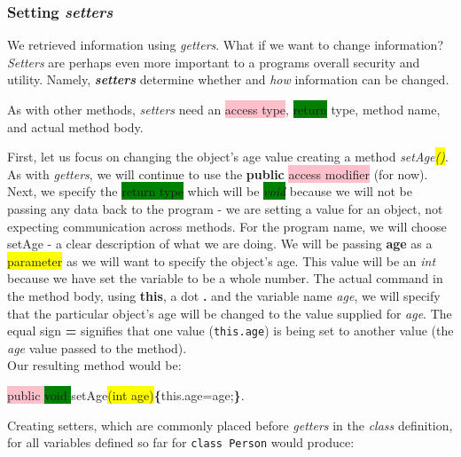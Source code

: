 \documentclass{article}
\begin{document}
\begin{flushleft}
\subsubsection{Setting \emph{setters}}
We retrieved information using \emph{getters}. What if we want to change information? \emph{Setters} are perhaps even more important to a programs overall security and utility. Namely, \textbf{\emph{setters}} determine whether and \emph{how} information can be changed.\par
As with other methods, \emph{setters} need an  \colorbox{pink}{access type}, \colorbox{green}{return} type, method \colorbox{babyblueeyes}{name}, and actual \colorbox{bananamania}{method body}. \par
First, let us focus on changing the object's age value creating a method \emph{ \colorbox{babyblueeyes}{setAge}\colorbox{yellow}{()}}. As with \emph{getters}, we will continue to use the \textbf{public} \colorbox{pink}{access modifier} (for now). Next, we specify the \colorbox{green}{return type} which will be \emph{\colorbox{green}{void}} because we will not be passing any data back to the program - we are setting a value for an object, not expecting communication across methods. For the program name, we will choose \colorbox{babyblueeyes}{setAge} - a clear description of what we are doing. We will be passing \textbf{age} as a \colorbox{yellow}{parameter} as we will want to specify the object's age. This value will be an \emph{int} because we have set the variable to be a whole number. The actual command in the \colorbox{bananamania}{method body}, using \textbf{this}, a dot \textbf{.} and the variable name \emph{age}, we will specify that the particular object's age will be changed to the value supplied for \emph{age}. The equal sign \textbf{=} signifies that one value (\texttt{this.age}) is being set to another value (the \emph{age} value passed to the method). \\ Our resulting method would be:
\begin{tcolorbox}[enhanced,breakable, before upper={\let\clearpage\relax}, width=4in,center upper,
    fontupper=\bfseries,drop fuzzy shadow southeast,
    boxrule=0.4pt,sharp corners,colframe=gray!80!black,colback=gray!10]
 \colorbox{pink}{public }\colorbox{green}{void }\colorbox{babyblueeyes}{setAge}\colorbox{yellow}{(int age)}\textbf{\{}\colorbox{bananamania}{this.age=age;}\textbf{\}}.
  \end{tcolorbox}
\par

Creating setters, which are commonly placed before \emph{getters} in the \emph{class} definition, for all variables defined so far for \texttt{class Person} would produce:


\end{flushleft}
\end{document}
